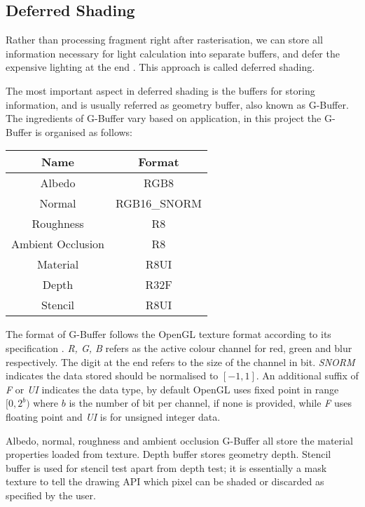 \documentclass[oneside, a4paper]{report}
\begin{document}
    \subsection{Deferred Shading}

    Rather than processing fragment right after rasterisation, we can store all information necessary for light calculation into separate buffers, and defer the expensive lighting at the end \cite{deferred}. This approach is called deferred shading.

    The most important aspect in deferred shading is the buffers for storing information, and is usually referred as geometry buffer, also known as G-Buffer. The ingredients of G-Buffer vary based on application, in this project the G-Buffer is organised as follows:

    \begin{center}
        \begin{tabular}{|c|c|}
            \hline
            Name & Format \\
            \hline
            \hline
            Albedo & RGB8 \\
            \hline
            Normal & RGB16\_SNORM \\
            \hline
            Roughness & R8 \\
            \hline
            Ambient Occlusion & R8 \\
            \hline
            Material & R8UI \\
            \hline
            Depth & R32F \\
            \hline
            Stencil & R8UI \\
            \hline
        \end{tabular}
    \end{center}

    The format of G-Buffer follows the OpenGL texture format according to its specification \cite{opengl4_spec}. \textit{R, G, B} refers as the active colour channel for red, green and blur respectively. The digit at the end refers to the size of the channel in bit. \textit{SNORM} indicates the data stored should be normalised to \([-1, 1]\). An additional suffix of \textit{F} or \textit{UI} indicates the data type, by default OpenGL uses fixed point in range \([0, 2^{b})\) where $b$ is the number of bit per channel, if none is provided, while \textit{F} uses floating point and \textit{UI} is for unsigned integer data.

    Albedo, normal, roughness and ambient occlusion G-Buffer all store the material properties loaded from texture. Depth buffer stores geometry depth. Stencil buffer is used for stencil test apart from depth test; it is essentially a mask texture to tell the drawing API which pixel can be shaded or discarded as specified by the user.
\end{document}
